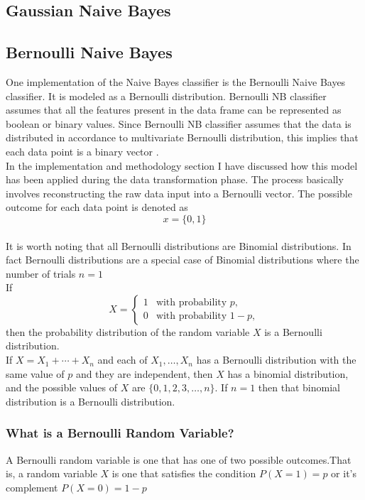 \documentclass[12pt, letterpaper, titlepage]{report}
\begin{document}
\subsection{Gaussian Naive Bayes}
\subsection{Bernoulli Naive Bayes}
One implementation of the Naive Bayes classifier is the Bernoulli Naive Bayes classifier. It is modeled as a Bernoulli distribution. Bernoulli NB classifier assumes that all the features present in the data frame can be represented as boolean or binary values. Since Bernoulli NB classifier assumes that the data is distributed in accordance to multivariate Bernoulli distribution, this implies that each data point is a binary vector \citep{shimodaira2014text}.\\
In the implementation and methodology section I have discussed how this model has been applied during the data transformation phase. The process basically involves reconstructing the raw data input into a Bernoulli vector. The possible outcome for each data point is denoted as $$x = \{0,1\}$$\\ 

It is worth noting that all Bernoulli distributions are Binomial distributions. In fact Bernoulli distributions are a special case of Binomial distributions where the number of trials $n=1$\\

If
$$
X=\begin{cases} 1 & \text{with probability }p, \\ 0 & \text{with probability }1-p, \end{cases}
$$
then the probability distribution of the random variable $X$ is a Bernoulli distribution.\\

If $X=X_1+\cdots+X_n$ and each of $X_1,\ldots,X_n$ has a Bernoulli distribution with the same value of $p$ and they are independent, then $X$ has a binomial distribution, and the possible values of $X$ are $\{0,1,2,3,\ldots,n\}$.  If $n=1$ then that binomial distribution is a Bernoulli distribution.

\subsubsection*{What is a Bernoulli Random Variable?}
A Bernoulli random variable is one that has one of two possible outcomes.That is, a random variable $X$ is one that satisfies the condition $P(X=1) = p$ or it's complement $P(X=0) = 1 - p$ 
\end{document}
